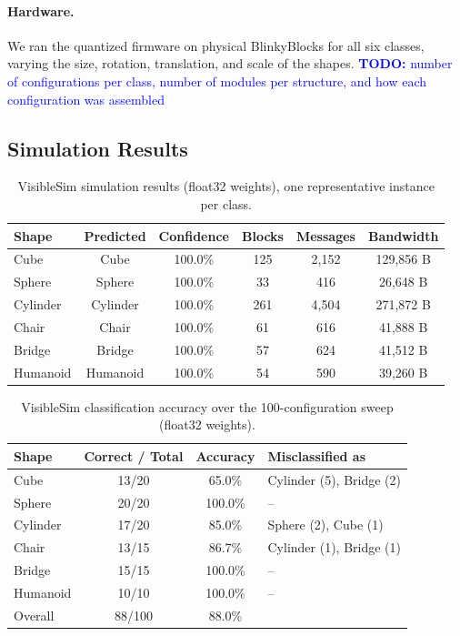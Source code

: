 \documentclass[12pt]{article}
\newcommand{\todo}[1]{\textcolor{blue}{\textbf{TODO:} #1}}
\begin{document}
\paragraph{Hardware.} We ran the quantized firmware on physical BlinkyBlocks for all six classes, varying the size, rotation, translation, and scale of the shapes. \todo{number of configurations per class, number of modules per structure, and how each configuration was assembled}

\subsection{Simulation Results}
\begin{table}[tb]
    \centering
    \caption{VisibleSim simulation results (float32 weights), one representative instance per class.}
    \label{tab:sim-results}
    \small
    \begin{tabular}{lccccc}
        \toprule
        Shape & Predicted & Confidence & Blocks & Messages & Bandwidth \\
        \midrule
        Cube     & Cube     & 100.0\% & 125 & 2{,}152 & 129{,}856 B \\
        Sphere   & Sphere   & 100.0\% & 33  & 416     & 26{,}648 B \\
        Cylinder & Cylinder & 100.0\% & 261 & 4{,}504 & 271{,}872 B \\
        Chair    & Chair    & 100.0\% & 61  & 616     & 41{,}888 B \\
        Bridge   & Bridge   & 100.0\% & 57  & 624     & 41{,}512 B \\
        Humanoid & Humanoid & 100.0\% & 54  & 590     & 39{,}260 B \\
        \bottomrule
    \end{tabular}
\end{table}

\begin{table}[tb]
    \centering
    \caption{VisibleSim classification accuracy over the 100-configuration sweep (float32 weights).}
    \label{tab:sim-sweep}
    \begin{tabular}{lccl}
        \toprule
        Shape & Correct / Total & Accuracy & Misclassified as \\
        \midrule
        Cube      & 13/20 & 65.0\%  & Cylinder (5), Bridge (2) \\
        Sphere    & 20/20 & 100.0\% & -- \\
        Cylinder  & 17/20 & 85.0\%  & Sphere (2), Cube (1) \\
        Chair     & 13/15 & 86.7\%  & Cylinder (1), Bridge (1) \\
        Bridge    & 15/15 & 100.0\% & -- \\
        Humanoid  & 10/10 & 100.0\% & -- \\
        \midrule
        Overall   & 88/100 & 88.0\% & \\
        \bottomrule
    \end{tabular}
\end{table}
\end{document}
